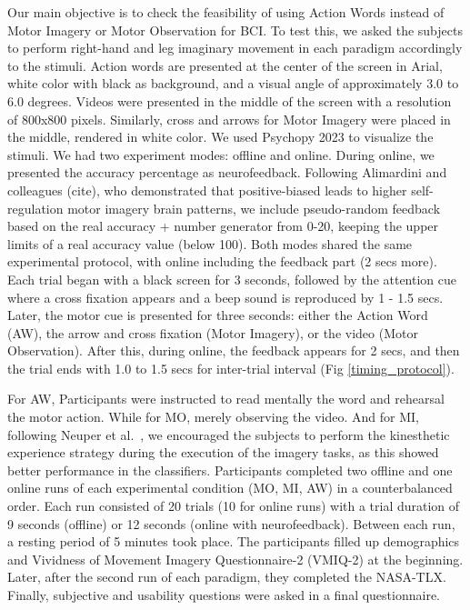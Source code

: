 \documentclass[10pt,letterpaper]{article}
\begin{document}
Our main objective is to check the feasibility of using Action Words instead of Motor Imagery or Motor Observation for BCI. To test this, we asked the subjects to perform right-hand and leg imaginary movement in each paradigm accordingly to the stimuli. Action words are presented at the center of the screen in Arial, white color with black as background, and a visual angle of approximately 3.0 to 6.0 degrees. Videos were presented in the middle of the screen with a resolution of 800x800 pixels. Similarly, cross and arrows for Motor Imagery were placed in the middle, rendered in white color. We used Psychopy 2023 to visualize the stimuli. We had two experiment modes: offline and online. During online, we presented the accuracy percentage as neurofeedback. Following Alimardini and colleagues (cite), who demonstrated that positive-biased leads to higher self-regulation motor imagery brain patterns, we include pseudo-random feedback based on the real accuracy + number generator from 0-20, keeping the upper limits of a real accuracy value (below 100). Both modes shared the same experimental protocol, with online including the feedback part (2 secs more). Each trial began with a black screen for 3 seconds, followed by the attention cue where a cross fixation appears and a beep sound is reproduced by 1 - 1.5 secs. Later, the motor cue is presented for three seconds: either the Action Word (AW), the arrow and cross fixation (Motor Imagery), or the video (Motor Observation). After this, during online, the feedback appears for 2 secs, and then the trial ends with 1.0 to 1.5 secs for inter-trial interval (Fig \ref{timing_protocol}).

For AW, Participants were instructed to read mentally the word and rehearsal the motor action. While for MO, merely observing the video. And for MI, following Neuper et al.~\cite{Neuper38}, we encouraged the subjects to perform the kinesthetic experience strategy during the execution of the imagery tasks, as this showed better performance in the classifiers. Participants completed two offline and one online runs of each experimental condition (MO, MI, AW) in a counterbalanced order. Each run consisted of 20 trials (10 for online runs) with a trial duration of 9 seconds (offline) or 12 seconds (online with neurofeedback). Between each run, a resting period of 5 minutes took place. 
The participants filled up demographics and Vividness of Movement Imagery Questionnaire-2 (VMIQ-2) at the beginning. Later, after the second run of each paradigm, they completed the NASA-TLX. Finally, subjective and usability questions were asked in a final questionnaire. 
\end{document}
